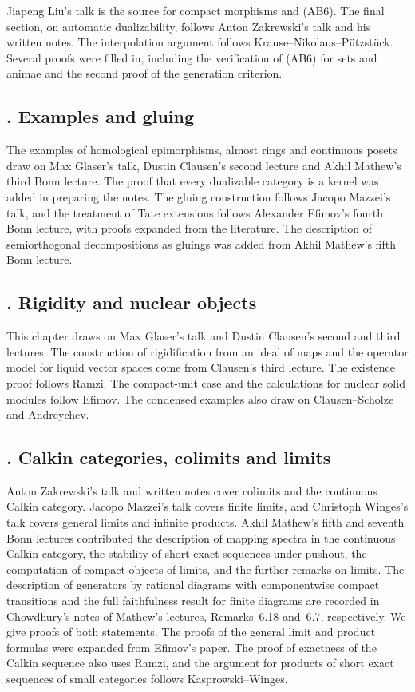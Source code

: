 \documentclass[11pt]{book}
\begin{document}
	Jiapeng Liu's talk is the source for compact morphisms and (AB6). The final section, on automatic dualizability, follows Anton Zakrewski's talk and his written notes. The interpolation argument follows Krause--Nikolaus--P\"utzst\"uck. Several proofs were filled in, including the verification of (AB6) for sets and animae and the second proof of the generation criterion.

	\subsection*{. Examples and gluing}

	The examples of homological epimorphisms, almost rings and continuous posets draw on Max Glaser's talk, Dustin Clausen's second lecture and Akhil Mathew's third Bonn lecture. The proof that every dualizable category is a kernel was added in preparing the notes. The gluing construction follows Jacopo Mazzei's talk, and the treatment of Tate extensions follows Alexander Efimov's fourth Bonn lecture, with proofs expanded from the literature. The description of semiorthogonal decompositions as gluings was added from Akhil Mathew's fifth Bonn lecture.

	\subsection*{. Rigidity and nuclear objects}

	This chapter draws on Max Glaser's talk and Dustin Clausen's second and third lectures. The construction of rigidification from an ideal of maps and the operator model for liquid vector spaces come from Clausen's third lecture. The existence proof follows Ramzi. The compact-unit case and the calculations for nuclear solid modules follow Efimov. The condensed examples also draw on Clausen--Scholze and Andreychev.

	\subsection*{. Calkin categories, colimits and limits}

	Anton Zakrewski's talk and written notes cover colimits and the continuous Calkin category. Jacopo Mazzei's talk covers finite limits, and Christoph Winges's talk covers general limits and infinite products. Akhil Mathew's fifth and seventh Bonn lectures contributed the description of mapping spectra in the continuous Calkin category, the stability of short exact sequences under pushout, the computation of compact objects of limits, and the further remarks on limits. The description of generators by rational diagrams with componentwise compact transitions and the full faithfulness result for finite diagrams are recorded in \href{https://www.mpim-bonn.mpg.de/de/webfm_send/881/1}{Chowdhury's notes of Mathew's lectures}, Remarks~6.18 and~6.7, respectively. We give proofs of both statements. The proofs of the general limit and product formulas were expanded from Efimov's paper. The proof of exactness of the Calkin sequence also uses Ramzi, and the argument for products of short exact sequences of small categories follows Kasprowski--Winges.
\end{document}
